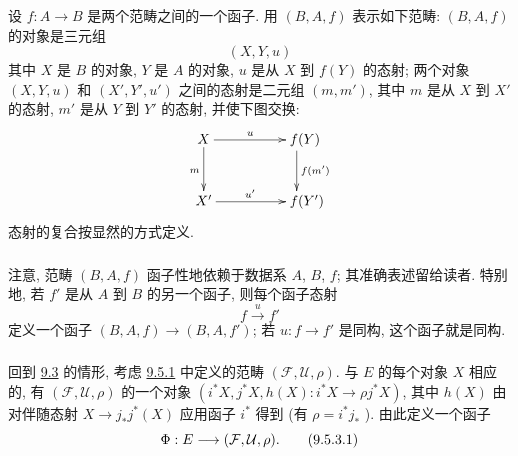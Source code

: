 \subsubsection{}
设 $f:A\rightarrow B$ 是两个范畴之间的一个函子.
用 $(B,A,f)$ 表示如下范畴:
$(B,A,f)$ 的对象是三元组
$$
(X,Y,u)
$$
其中 $X$ 是 $B$ 的对象, $Y$ 是 $A$ 的对象,
$u$ 是从 $X$ 到 $f(Y)$ 的态射;
两个对象 $(X,Y,u)$ 和 $(X',Y',u')$ 之间的态射是二元组 $(m,m')$,
其中 $m$ 是从 $X$ 到 $X'$ 的态射,
$m'$ 是从 $Y$ 到 $Y'$ 的态射, 并使下图交换:
\[
\xymatrix@C=1.5cm@R=1cm{
X \ar[r]^{u} \ar[d]_{m} & **[r]f(Y) \ar[d]^{f(m')}\\
X' \ar[r]^{u'}& **[r]f(Y') }
\]
态射的\pageoriginale 复合按显然的方式定义.

\subsubsection{}
注意, 范畴 $(B,A,f)$ 函子性地依赖于数据系 $A$, $B$, $f$;
其准确表述留给读者.
特别地, 若 $f'$ 是从 $A$ 到 $B$ 的另一个函子,
则每个函子态射
$$
f\xrightarrow{u} f'
$$
定义一个函子 $(B,A,f)\rightarrow(B,A,f')$;
若 $u:f\rightarrow f'$ 是同构, 这个函子就是同构.

\subsubsection{}
回到 \hyperref[IV.subsec9.3]{9.3} 的情形,
考虑 \hyperref[IV.subsubsec9.5.1]{9.5.1} 中定义的范畴
$(\mathcal{F},\mathcal{U},\rho)$.
与 $E$ 的每个对象 $X$ 相应的,
有 $(\mathcal{F},\mathcal{U},\rho)$ 的一个对象
$(i^{\ast}X,j^{\ast}X,h(X):i^{\ast}X\rightarrow\rho j^{\ast}X)$,
其中 $h(X)$ 由对伴随态射 $X\rightarrow j_{\ast}j^{\ast}(X)$
应用函子 $i^{\ast}$ 得到
(有 $\rho=i^{\ast}j_{\ast}$
).
由此定义一个函子
\begin{equation*}
\Phi:E\longrightarrow (\mathcal{F}, \mathcal{U},
\rho){}.\tag{9.5.3.1}
\end{equation*}

